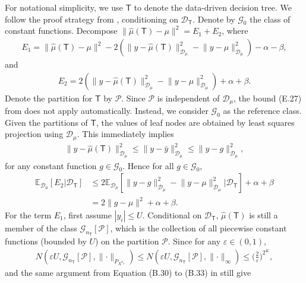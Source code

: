 \documentclass[10pt]{article}
\def\treeT{\mathsf{T}}
\def\E{\mathbb{E}}
\def\G{\mathcal{G}}
\def\dataD{\mathcal{D}}
\def\partitionP{\mathcal{P}}
\theoremstyle{definition}
\theoremstyle{remark}
\begin{document}
For notational simplicity, we use $\treeT$ to denote the data-driven decision tree. We follow the proof strategy from \citet[Theorem 4.3]{klusowski2024large}, conditioning on $\dataD_{\treeT}$. Denote by $\G_0$ the class of constant functions. Decompose $\lVert \hat{\mu}(\treeT) - \mu \rVert^2 = E_1 + E_2$, where
\begin{align*}
    E_1 = \lVert \hat{\mu}(\treeT) - \mu \rVert^2 - 2 (\lVert y - \hat{\mu}(\treeT)\rVert^2_{\dataD_{\mu}} - \lVert y - \mu\rVert^2_{\dataD_{\mu}}) - \alpha - \beta,
\end{align*}
and
\begin{align*}
    E_2 = 2 (\lVert y - \hat{\mu}(\treeT)\rVert^2_{\dataD_{\mu}} - \lVert y - \mu\rVert^2_{\dataD_{\mu}}) + \alpha + \beta.
\end{align*}
Denote the partition for $\treeT$ by $\partitionP$. Since $\partitionP$ is independent of $\dataD_{\mu}$, the bound (E.27) from \citet{klusowski2024large} does not apply automatically. Instead, we consider $\G_0$ as the reference class. Given the partitions of $\treeT$, the values of leaf nodes are obtained by least squares projection using $\dataD_{\mu}$. This immediately implies
\begin{align*}
    \lVert y - \hat{\mu}(\treeT)\rVert^2_{\dataD_{\mu}} \leq \lVert y - \bar{y}\rVert^2_{\dataD_{\mu}} \leq
    \lVert y - g \rVert^2_{\dataD_{\mu}},
\end{align*}
for any constant function $g \in \G_0$. Hence for all $g \in \G_0$, 
\begin{align*}
    \E_{\dataD_{\mu}}[E_2|\dataD_{\treeT}] & \leq 2 \E_{\dataD_{\mu}}[\lVert y - g\rVert^2_{\dataD_{\mu}} - \lVert y - \mu\rVert^2_{\dataD_{\mu}}|\dataD_{\treeT}] + \alpha + \beta \\
    & = 2 \lVert g - \mu \rVert^2 + \alpha + \beta.
\end{align*}
For the term $E_1$, first assume $|y_i| \leq U$. Conditional on $\dataD_{\treeT}$, $\hat{\mu}(\treeT)$ is still a member of the class $\G_{n_{\treeT}}[\partitionP]$, which is the collection of all piecewise constant functions (bounded by $U$) on the partition $\partitionP$. Since for any $\varepsilon \in (0,1)$,
\begin{align*}
    N(\varepsilon U, \G_{n_{\treeT}}[\partitionP], \lVert \cdot \rVert_{P_{X^{n_{\mu}}}}) 
    \leq N(\varepsilon U, \G_{n_{\treeT}}[\partitionP], \lVert \cdot \rVert_{\infty})
    \leq \bigg(\frac{2}{\varepsilon}\bigg)^{2^K},
\end{align*}
\citet[Theorem 11.4]{Gyorfi-etal_2002_book} and the same argument from Equation (B.30) to (B.33) in \citet{klusowski2024large} still give
\end{document}
